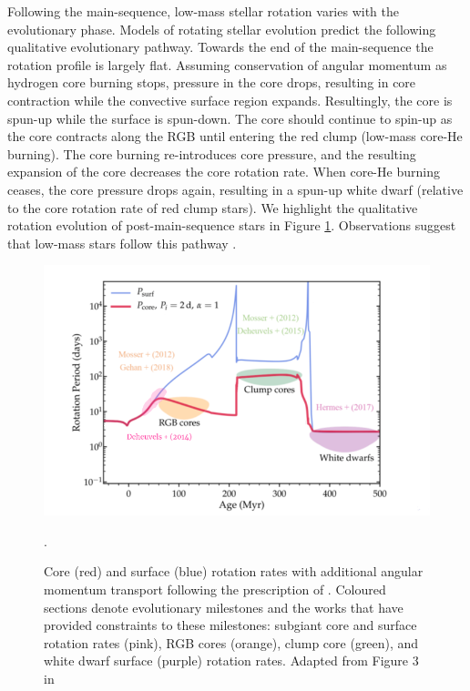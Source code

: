 Following the main-sequence, low-mass stellar rotation varies with the evolutionary phase.
Models of rotating stellar evolution \citep[see, e.g.,][]{maeder_evolution_2000,heger_presupernova_2000} predict the following qualitative evolutionary pathway.
Towards the end of the main-sequence the rotation profile is largely flat.
Assuming conservation of angular momentum as hydrogen core burning stops, pressure in the core drops, resulting in core contraction while the convective surface region expands.
Resultingly, the core is spun-up while the surface is spun-down.
The core should continue to spin-up as the core contracts along the RGB until entering the red clump (low-mass core-He burning).
The core burning re-introduces core pressure, and the resulting expansion of the core decreases the core rotation rate.
When core-He burning ceases, the core pressure drops again, resulting in a spun-up white dwarf (relative to the core rotation rate of red clump stars).
We highlight the qualitative rotation evolution of post-main-sequence stars in Figure \ref{fig:poms_evo}.
Observations suggest that low-mass stars follow this pathway \citep{mosser_spin_2012,deheuvels_seismic_2014,deheuvels_seismic_2015,hermes_white_2017,gehan_core_2018,deheuvels_seismic_2020}.

\begin{figure}[h]
    \includegraphics[width=\textwidth]{Figures/intro_figures/qualitative_evo.png}
    \caption[Qualitative core and surface rotation rates of post-main-sequence stars.]{Core (red) and surface (blue) rotation rates with additional angular momentum transport following the prescription of \citet{spada_angular_2016}. Coloured sections denote evolutionary milestones and the works that have provided constraints to these milestones: subgiant core and surface rotation rates (pink), RGB cores (orange), clump core (green), and white dwarf surface (purple) rotation rates. Adapted from Figure 3 in \citet{fuller_slowing_2019}}.
    \label{fig:poms_evo}
\end{figure}


